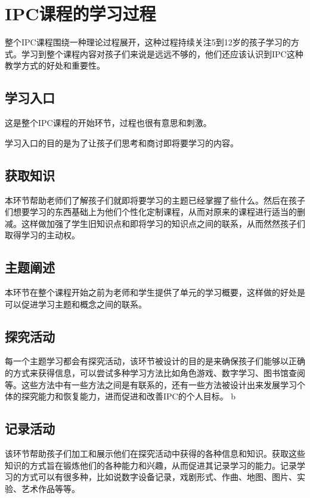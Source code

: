 \section{IPC课程的学习过程}
     整个IPC课程围绕一种理论过程展开，这种过程持续关注5到12岁的孩子学习的方式。学习到整个课程内容对孩子们来说是远远不够的，他们还应该认识到IPC这种教学方式的好处和重要性。 \par
     

\subsection{学习入口}
    这是整个IPC课程的开始环节，过程也很有意思和刺激。 \par
    学习入口的目的是为了让孩子们思考和商讨即将要学习的内容。

\subsection{获取知识}
    本环节帮助老师们了解孩子们就即将要学习的主题已经掌握了些什么。然后在孩子们想要学习的东西基础上为他们个性化定制课程，从而对原来的课程进行适当的删减。这样做加强了学生旧知识点和即将学习的知识点之间的联系，从而然然孩子们取得学习的主动权。\par

\subsection{主题阐述}
    本环节在整个课程开始之前为老师和学生提供了单元的学习概要，这样做的好处是可以促进学习主题和概念之间的联系。\par

\subsection{探究活动}
    每一个主题学习都会有探究活动，该环节被设计的目的是来确保孩子们能够以正确的方式来获得信息，可以尝试多种学习方法比如角色游戏、数字学习、图书馆查阅等。这些方法中有一些方法之间是有联系的，还有一些方法被设计出来发展学习个体的探究能力和恢复能力，进而促进和改善IPC的个人目标。
b

\subsection{记录活动}
    该环节帮助孩子们加工和展示他们在探究活动中获得的各种信息和知识。获取这些知识的方式旨在锻炼他们的各种能力和兴趣，从而促进其记录学习的能力。记录学习的方式可以有很多种，比如说数字设备记录，戏剧形式、作曲、地图、图片、实验、艺术作品等等。

